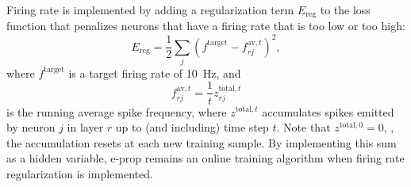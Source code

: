 		Firing rate is implemented by adding a regularization term $E_\text{reg}$ to the loss function that penalizes neurons that have a firing rate that is too low or too high:
		\begin{equation}
			E_\text{reg} = \frac{1}{2}\sum_j\left(f^\text{target} - f^{\text{av}, t}_{rj}\right)^2,
		\end{equation}
		where $f^\text{target}$ is a target firing rate of \SI{10}{\Hz}, and
		\begin{equation}
		f^{\text{av},t}_{rj} = \frac{1}{t} z^{\text{total},t}_{rj}
		\end{equation}
		is the running average spike frequency, where $z^{\text{total},t}$ accumulates spikes emitted by neuron $j$ in layer $r$ up to (and including) time step $t$.
		Note that $z^{\text{total},0} = 0$, \ie, the accumulation resets at each new training sample.
		By implementing this sum as a hidden variable, e-prop remains an online training algorithm when firing rate regularization is implemented.

